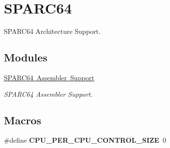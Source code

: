 \hypertarget{group__RTEMSScoreCPUSPARC64}{}\section{S\+P\+A\+R\+C64}
\label{group__RTEMSScoreCPUSPARC64}


S\+P\+A\+R\+C64 Architecture Support.  


\subsection*{Modules}
\begin{DoxyCompactItemize}
\item 
\mbox{\hyperlink{group__RTEMSScoreCPUSPARC64ASM}{S\+P\+A\+R\+C64 Assembler Support}}
\begin{DoxyCompactList}\small\item\em S\+P\+A\+R\+C64 Assembler Support. \end{DoxyCompactList}\end{DoxyCompactItemize}
\subsection*{Macros}
\begin{DoxyCompactItemize}
\item 
\mbox{\label{group__RTEMSScoreCPUSPARC64_gaf8e38596ad3db49995fd8eb9fb4e86b2}} 
\#define {\bfseries C\+P\+U\+\_\+\+P\+E\+R\+\_\+\+C\+P\+U\+\_\+\+C\+O\+N\+T\+R\+O\+L\+\_\+\+S\+I\+ZE}~0
\end{DoxyCompactItemize}
